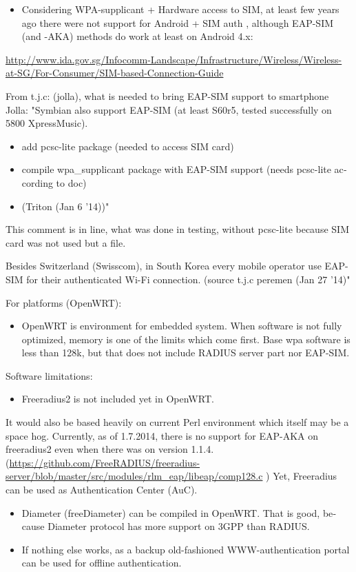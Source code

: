 \documentclass[12pt,a4paper,english]{tutthesis}
\begin{document}
\begin{otherlanguage}{english}
\begin{itemize}
\item Considering WPA-supplicant + Hardware access to SIM,
at least few years ago there were not support for Android + SIM
auth \cite{android-sim}, although EAP-SIM (and -AKA) methods do
work at least on Android 4.x:
\end{itemize}
\url{http://www.ida.gov.sg/Infocomm-Landscape/Infrastructure/Wireless/Wireless-at-SG/For-Consumer/SIM-based-Connection-Guide}


From t.j.c: (jolla), what is needed to bring EAP-SIM support
to smartphone Jolla:
"Symbian also support EAP-SIM (at least S60r5, tested successfully on 5800 XpressMusic).

\begin{itemize}
\item add pcsc-lite package (needed to access SIM card)
\item compile wpa\_supplicant package with EAP-SIM support (needs pcsc-lite according to doc)
\item{}
(Triton (Jan 6 '14))"
\end{itemize}

This comment is in line, what was done in testing, without pcsc-lite
because SIM card was not used but a file.

Besides Switzerland (Swisscom), in South Korea every mobile operator
use EAP-SIM for their authenticated Wi-Fi connection.
(source t.j.c peremen (Jan 27 '14)"



For platforms (OpenWRT):
\begin{itemize}
\item OpenWRT is environment for embedded system.
When software is not fully optimized, memory is one of the limits which come first.
Base  wpa software is less than 128k, but 
that does not include RADIUS server part nor EAP-SIM.
\end{itemize}

Software limitations: 
\begin{itemize}
\item Freeradius2 is not included yet in OpenWRT.
\end{itemize}
It would also be based heavily on current Perl environment which
itself may be a space hog. 
Currently, as of 1.7.2014, there is no support for EAP-AKA on
freeradius2 even when there was on version 1.1.4.
(\url{https://github.com/FreeRADIUS/freeradius-server/blob/master/src/modules/rlm_eap/libeap/comp128.c} )
Yet, Freeradius can be used as Authentication Center (AuC).
\begin{itemize}
\item Diameter (freeDiameter) can be compiled in OpenWRT. That is good,
because Diameter protocol has more support on 3GPP than RADIUS.
\item If nothing else works, as a backup old-fashioned WWW-authentication
portal can be used for offline authentication.
\end{itemize}


\end{otherlanguage}
\end{document}
